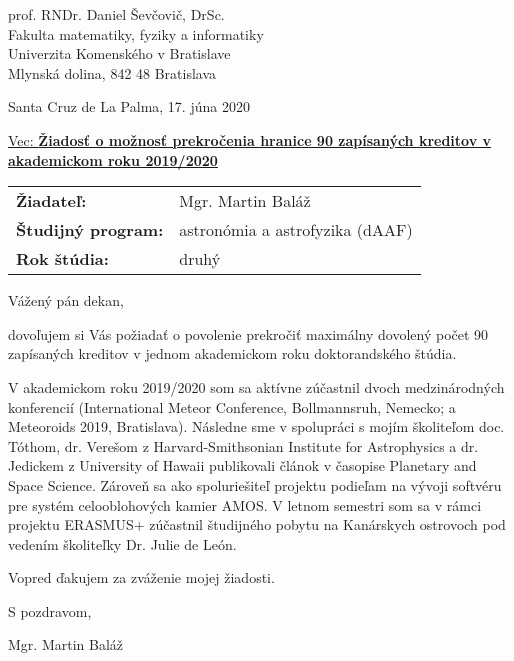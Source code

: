 \documentclass[12pt, a4paper, oneside]{report}
\begin{document}
    \linespread{1.3}
    \setcounter{secnumdepth}{0}
    \setlength{\parindent}{0cm}
    \setlength{\parskip}{3mm}
    \setlength{\baselineskip}{6mm}
    \setlength{\abovedisplayskip}{0mm}
    \setlength{\belowdisplayskip}{0mm}
    \setlength{\abovedisplayshortskip}{0mm}
    \setlength{\belowdisplayshortskip}{5mm}
    \renewcommand{\arraystretch}{1.2}

    \pagestyle{empty}
    \thispagestyle{first}

    \vspace*{6mm}
    \hfill
    \begin{minipage}{0.4 \linewidth}
        \linespread{1.6}
        prof. RNDr. Daniel Ševčovič, DrSc. \\[1mm]
        Fakulta matematiky, fyziky a informatiky \\[1mm]
        Univerzita Komenského v Bratislave \\[1mm]
        Mlynská dolina, 842 48 Bratislava

        \vspace*{12mm}
        Santa Cruz de La Palma, 17. júna 2020
    \end{minipage}

    \vspace{10mm}

    \underline{Vec: \textbf{Žiadosť o možnosť prekročenia hranice 90 zapísaných kreditov v akademickom roku 2019/2020}}

    \vspace{6mm}

    \begin{tabular}{l l}
        \textbf{Žiadateľ:}          & Mgr. Martin Baláž \\
        \textbf{Študijný program:}  & astronómia a astrofyzika (dAAF) \\
        \textbf{Rok štúdia:}        & druhý \\
    \end{tabular}

    \vspace{8mm}

    Vážený pán dekan,

    dovoľujem si Vás požiadať o povolenie prekročiť maximálny dovolený počet 90 zapísaných
    kreditov v jednom akademickom roku doktorandského štúdia.

    V akademickom roku 2019/2020 som sa aktívne zúčastnil dvoch medzinárodných konferencií
    (International Meteor Conference, Bollmannsruh, Nemecko; a Meteoroids 2019, Bratislava).
    Následne sme v spolupráci s mojím školiteľom doc. Tóthom, dr. Verešom z Harvard-Smithsonian Institute for Astrophysics
    a dr. Jedickem z University of Hawaii publikovali článok v časopise Planetary and Space Science.
    Zároveň sa ako spoluriešiteľ projektu podieľam na vývoji softvéru pre systém celooblohových kamier AMOS.
    V letnom semestri som sa v rámci projektu ERASMUS+ zúčastnil študijného pobytu na Kanárskych ostrovoch
    pod vedením školiteľky Dr. Julie de León.

    Vopred ďakujem za zváženie mojej žiadosti.

    \vspace*{6mm}

    S pozdravom,

    \hfill Mgr. Martin Baláž
\end{document}
